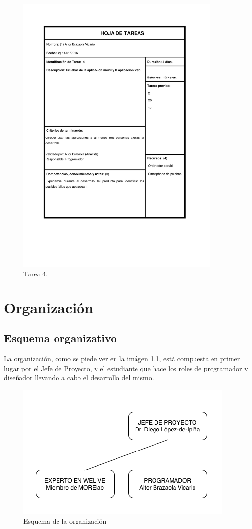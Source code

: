 \documentclass{DeustoFDP}
\begin{document}
\begin{figure}[H]
	\centering
	\includegraphics[width=0.9\textwidth]{fig/Tareas/4}
	\caption{Tarea 4.}
	\label{fig:t4}
\end{figure}

\chapter{Organización}
\section{Esquema organizativo}
La organización, como se piede ver en la imágen \ref{fig:esquemaorganizacion}, está compuesta en primer lugar por el Jefe de Proyecto, y el estudiante que hace los roles de programador y diseñador llevando a cabo el desarrollo del mismo.

\begin{figure}[h]
\centering
\includegraphics[width=0.7\linewidth]{fig/esquemaorganizacion}
\caption[Esquema de la organización]{Esquema de la organización}
\label{fig:esquemaorganizacion}
\end{figure}
\end{document}
